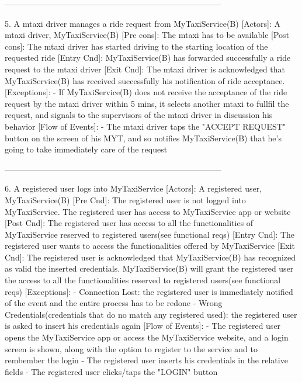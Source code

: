 \documentclass[11pt]{article} %
\begin{document}
      --------------------------------------------------------------------------------

      5. A mtaxi driver manages a ride request from MyTaxiService(B)
        [Actors]: A mtaxi driver, MyTaxiService(B)
        [Pre cons]: The mtaxi has to be available
        [Post cons]: The mtaxi driver has started driving to the starting location of the requested ride
        [Entry Cnd]: MyTaxiService(B) has forwarded successfully a ride request to the mtaxi driver
        [Exit Cnd]: The mtaxi driver is acknowledged that MyTaxiService(B) has received successfully his notification
        of ride acceptance.
        [Exceptions]:
          - If MyTaxiService(B) does not receive the acceptance of the ride request by the mtaxi driver
          within 5 mins, it selects another mtaxi to fullfil the request, and signals to the supervisors
          of the mtaxi driver in discussion his behavior
        [Flow of Events]:
          - The mtaxi driver taps the "ACCEPT REQUEST" button on the screen of his MYT, and so notifies MyTaxiService(B)
          that he's going to take immediately care of the request


      --------------------------------------------------------------------------------

      6. A registered user logs into MyTaxiService
        [Actors]: A registered user, MyTaxiService(B)
        [Pre Cnd]: The registered user is not logged into MyTaxiService. The registered
        user has access to MyTaxiService app or website
        [Post Cnd]: The registered user has access to all the functionalities of
        MyTaxiService reserved to registered users(see functional reqs)
        [Entry Cnd]: The registered user wants to access the functionalities offered by MyTaxiService
        [Exit Cnd]:  The registered user is acknowledged that MyTaxiService(B) has recognized as valid the inserted
        credentials. MyTaxiService(B) will grant the registered user the access to all the functionalities
        reserved to registered users(see functional reqs)
        [Exceptions]:
          - Connection Lost: the registered user is immediately notified of the event and the entire process
          has to be redone
          - Wrong Credentials(credentials that do no match any registered used): the registered user is asked to insert his credentials again
        [Flow of Events]:
          - The registered user opens the MyTaxiService app or access the MyTaxiService website, and a login
          screen is shown, along with the option to register to the service and to rembember the login
          - The registered user inserts his credentials in the relative fields
          - The registered user clicks/taps the "LOGIN" button
\end{document}
